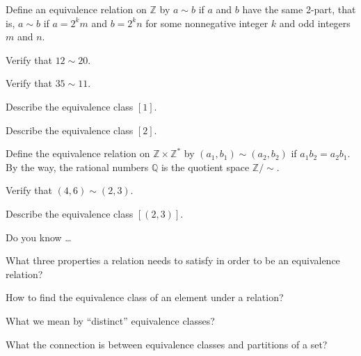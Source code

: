 \begin{exer}[\exerU] %
\label{exer_equiv_classes_2part}
    Define an equivalence relation on $\mathbb{Z}$ by $a \sim b$ if $a$ and $b$ have the same 2-part, that is, $a \sim b$ if $a = 2^km$ and $b=2^kn$ for some nonnegative integer $k$ and odd integers $m$ and $n$.
        \begin{exerpart}
            \item Verify that $12 \sim 20$.
            \item Verify that $35 \sim 11$.
            \item Describe the equivalence class $[1]$.
            \item Describe the equivalence class $[2]$.
        \end{exerpart}
\end{exer}

\begin{exer}[\exerU] %
\label{exer_equiv_classes_rationals}
    Define the equivalence relation on $\mathbb{Z} \times\mathbb{Z}^\ast$ by $(a_1,b_1) \sim (a_2,b_2)$ if $a_1b_2 = a_2b_1$.  By the way, the rational numbers $\mathbb{Q}$ is the quotient space $\mathbb{Z}/\sim$.
        \begin{exerpart}
            \item Verify that $(4,6) \sim (2,3)$.  
            \item Describe the equivalence class $[(2,3)]$.  
        \end{exerpart}
\end{exer}

\begin{exer}[\exerR] %
\label{exer_dyk_equiv_rel}
    Do you know \ldots
        \begin{exerpart}
            \item What three properties a relation needs to satisfy in order to be an equivalence relation?
            \item How to find the equivalence class of an element under a relation?
            \item What we mean by ``distinct'' equivalence classes?
            \item What the connection is between equivalence classes and partitions of a set?
        \end{exerpart}
\end{exer}

